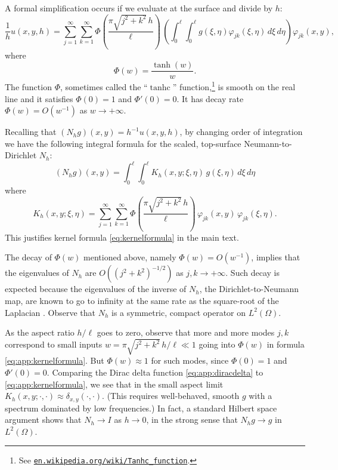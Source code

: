 \documentclass[letterpaper,final,12pt,reqno]{amsart}
\theoremstyle{cstyle}
\theoremstyle{cstyle*}
\theoremstyle{dstyle}
\numberwithin{equation}{section}
\begin{document}
A formal simplification occurs if we evaluate at the surface and divide by $h$:
\begin{equation*}
\frac{1}{h} u(x,y,h) = \sum_{j=1}^\infty \sum_{k=1}^\infty \Phi\left(\frac{\pi \sqrt{j^2+k^2}\,h}{\ell}\right) \,\left(\int_0^\ell \int_0^\ell g(\xi,\eta) \varphi_{jk}(\xi,\eta)\,d\xi\,d\eta\right) \varphi_{jk}(x,y),
\end{equation*}
where
    $$\Phi(w) = \frac{\tanh(w)}{w}.$$
The function $\Phi$, sometimes called the ``$\operatorname{tanhc}$'' function,\footnote{See \href{https://en.wikipedia.org/wiki/Tanhc_function}{\texttt{en.wikipedia.org/wiki/Tanhc\_function}}.} is smooth on the real line and it satisfies $\Phi(0)=1$ and $\Phi'(0)=0$.  It has decay rate $\Phi(w) = O(w^{-1})$ as $w \to +\infty$.

Recalling that $(N_h g)(x,y) = h^{-1} u(x,y,h)$, by changing order of integration we have the following integral formula for the scaled, top-surface Neumann-to-Dirichlet $N_h$:
    $$(N_h g)(x,y) = \int_0^\ell \int_0^\ell K_h(x,y;\xi,\eta)\, g(\xi,\eta)\,d\xi\,d\eta$$
where
\begin{equation}
K_h(x,y;\xi,\eta) = \sum_{j=1}^\infty \sum_{k=1}^\infty \Phi\left(\frac{\pi \sqrt{j^2+k^2}\,h}{\ell}\right) \, \varphi_{jk}(x,y) \, \varphi_{jk}(\xi,\eta). \label{eq:app:kernelformula}
\end{equation}
This justifies kernel formula \eqref{eq:kernelformula} in the main text.

The decay of $\Phi(w)$ mentioned above, namely $\Phi(w) = O(w^{-1})$, implies that the eigenvalues of $N_h$ are $O((j^2+k^2)^{-1/2})$ as $j,k \to+\infty$.  Such decay is expected because the eigenvalues of the inverse of $N_h$, the Dirichlet-to-Neumann map, are known to go to infinity at the same rate as the square-root of the Laplacian \cite{Girouardetal2022}.  Observe that $N_h$ is a symmetric, compact operator \cite{Evans2010} on $L^2(\Omega)$.

As the aspect ratio $h/\ell$ goes to zero, observe that more and more modes $j,k$ correspond to small inputs $w=\pi \sqrt{j^2+k^2}\,h/\ell \ll 1$ going into $\Phi(w)$ in formula \eqref{eq:app:kernelformula}.  But $\Phi(w)\approx 1$ for such modes, since $\Phi(0)=1$ and $\Phi'(0)=0$.  Comparing the Dirac delta function \eqref{eq:app:diracdelta} to \eqref{eq:app:kernelformula}, we see that in the small aspect limit $K_h(x,y;\cdot,\cdot) \approx \delta_{x,y}(\cdot,\cdot)$.  (This requires well-behaved, smooth $g$ with a spectrum dominated by low frequencies.)  In fact, a standard Hilbert space argument shows that $N_h \to I$ as $h\to 0$, in the strong sense that $N_h g \to g$ in $L^2(\Omega)$.
\end{document}
